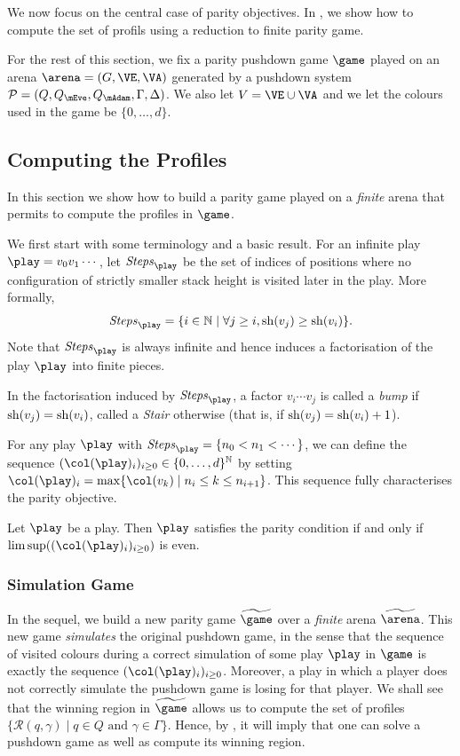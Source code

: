 We now focus on the central case of parity objectives. 
In , we show how to compute the set of profils using a reduction to finite parity game.

For the rest of this section, we fix a parity pushdown game $\game$ played on an arena $\arena = (G,\VE,\VA)$ generated by a pushdown system $\PDS = (Q,Q_{\mEve}, Q_{\mAdam}, \Gamma,\Delta)$. We also let $V=\VE\cup\VA$ and we let the colours used in the game be $\{0,\dots,d\}$.


\subsection{Computing the Profiles}
\label{10-subsec:computing-profiles}


In this section we show how to build a parity game played on a \emph{finite} arena that permits to compute the profiles in $\game$. 

We first start with some terminology and a basic result. For an infinite play $\play=v_0v_1\cdots$, let
$\Stepsg{\play}$ be the set of indices of positions where no
configuration of strictly smaller stack height is visited later in the
play. More formally, $$\Stepsg{\play}=\{i\in\mathbb{N}\mid \forall
j\geq i, \sh(v_j)\geq \sh(v_i)\}.$$ Note that $\Stepsg{\play}$ is always
infinite and hence induces a factorisation of the play $\play$ into
finite pieces.


In the factorisation induced by $\Stepsg{\play}$, a factor $v_i\cdots v_j$ is called a
\emph{bump} if $\mathrm{sh}(v_j)=\mathrm{sh}(v_i)$, called a \emph{Stair} otherwise (that is, if $\mathrm{sh}(v_j)=\mathrm{sh}(v_i)+1$).

For any play $\play$ with $\Stepsg{\play}=\{n_0<n_1<\cdots\}$, we can define the sequence $(\pdscol{\play}_i)_{i\geq
0}\in\{0,\dots,d\}^{\mathbb{N}}$ by setting $\pdscol{\play}_i=\max\{\pdscol{v_k}\mid n_i\leq k\leq n_{i+1}\}$.
This sequence fully characterises the parity objective.

\begin{proposition}\label{10-prop:trans_cond}
Let $\play$ be a play. Then $\play$ satisfies the parity condition  if and only if $\limsup((\pdscol{\play}_i)_{i\geq 0})$ is even.
\end{proposition}

\subsubsection{Simulation Game}

In the sequel, we build a new parity game $\fgame$ over a \emph{finite} arena $\farena$.
This new game
\emph{simulates} the original pushdown game, in the sense that the
sequence of visited colours during a correct simulation of some play $\play$ in $\game$ is
exactly the sequence $(\pdscol{\play}_i)_{i\geq 0}$. Moreover, a play in which
a player does not correctly simulate the pushdown game is losing
for that player. We shall see that the winning region in $\fgame$ allows us to compute the set of profiles $\{\mathcal{R}(q,\gamma) \mid q\in Q \text{ and } \gamma\in\Gamma\}$. Hence, by , it will imply that one can solve a pushdown game as well as compute its winning region.



